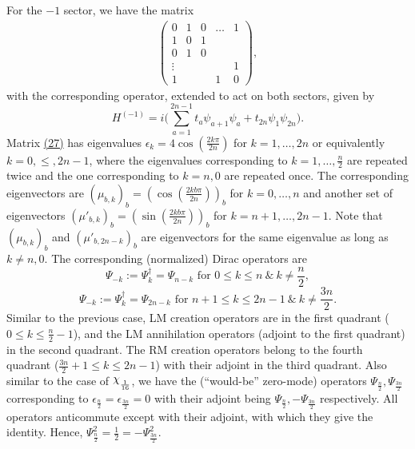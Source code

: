 \documentclass[twoside,11pt,titlepage]{amsart}
\renewcommand{\=}[1]{\stackrel{#1}{=}} %
\theoremstyle{definition}
\theoremstyle{remark}
\DeclareRobustCommand{\rchi}{{\mathpalette\irchi\relax}}
\newcommand{\irchi}[2]{\raisebox{\depth}{$#1\chi$}}
\begin{document}
For the $-1$ sector, we have the matrix
\begin{align}\label{eq27}
\begin{pmatrix}
         0 & 1 & 0 & \ldots & 1 \\
         1 & 0 & 1 & &  \\
         0 & 1 & 0 & &   \\
         \vdots &  &  &  & 1 \\
          1 &  & & 1 & 0 
\end{pmatrix},
\end{align}
with the corresponding operator, extended to act on both sectors, given by
$$H^{(-1)}=i \Big(\sum_{a=1}^{2n-1} t_a \psi_{a+1}\psi_a + t_{2n}\psi_1\psi_{2n}\Big).$$
Matrix \hyperref[eq27]{(27)} has eigenvalues $\epsilon_k=4\cos(\frac{2k\pi}{2n})$ for $k=1,\ldots,2n$ or equivalently $k=0,\le,2n-1$, where the eigenvalues corresponding to $k=1,\ldots,\frac{n}{2}$ are repeated twice and the one corresponding to $k=n,0$ are repeated once. The corresponding eigenvectors are $(\mu_{b,k})_b=(\cos(\frac{2kb\pi}{2n}))_b$ for $k=0, \ldots, n$ and another set of eigenvectors $(\mu'_{b,k})_b=(\sin(\frac{2kb\pi}{2n}))_b$ for $k=n+1,\ldots,2n-1$. Note that $(\mu_{b,k})_b$ and $(\mu'_{b,2n-k})_b$ are eigenvectors for the same eigenvalue as long as $k \neq n,0$. The corresponding (normalized) Dirac operators are
$$\Psi_{-k}:=\Psi_{k}^\dagger=\Psi_{n-k} \text{ for } 0 \le k \le n \ \& \ k\neq \frac{n}{2},$$
$$\Psi_{-k}:=\Psi_{k}^\dagger=\Psi_{2n-k} \text{ for } n+1 \le k \le 2n-1 \ \& \ k\neq \frac{3n}{2}.$$
Similar to the previous case, LM creation operators are in the first quadrant ($0 \le k \le \frac{n}{2}-1$), and the LM annihilation operators (adjoint to the first quadrant) in the second quadrant. The RM creation operators belong to the fourth quadrant ($\frac{3n}{2}+1 \le k \le 2n-1$) with their adjoint in the third quadrant. Also similar to the case of $\rchi_{\frac{1}{16}}$, we have the (``would-be'' zero-mode) operators $\Psi_{\frac{n}{2}},\Psi_{\frac{3n}{2}}$ corresponding to $\epsilon_{\frac{n}{2}}=\epsilon_{\frac{3n}{2}}=0$ with their adjoint being $\Psi_{\frac{n}{2}},-\Psi_{\frac{3n}{2}}$ respectively. All operators anticommute except with their adjoint, with which they give the identity. Hence, $\Psi_{\frac{n}{2}}^2=\frac{1}{2}=-\Psi_{\frac{3n}{2}}^2$.
\end{document}
